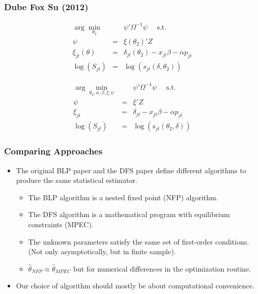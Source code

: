 \documentclass[xcolor=pdftex,dvipsnames,table,mathserif,aspectratio=169]{beamer}
\begin{document}
 \begin{frame}\frametitle{Dube Fox Su (2012)}
\footnotesize
\begin{eqnarray}
\label{blpnfxp}
\nonumber \arg \min_{\theta_2} && \psi' \Omega^{-1} \psi \quad \mbox{ s.t. } \\
\nonumber \psi &=& \xi(\theta_2)' Z\\
\xi_{jt}(\theta) &=& \delta_{jt}(\theta_2) - x_{jt} \beta - \alpha p_{jt} \\
\nonumber \log(S_{jt})  &=& \log(s_{jt}(\delta,\theta_2))
\end{eqnarray}

\begin{eqnarray}
\label{blpmpec}
\nonumber \arg \min_{\theta_2,\alpha,\beta, \xi,\psi} && \psi' \Omega^{-1}  \psi \quad \mbox{ s.t. } \\
 \psi &=& \xi' Z\\
\nonumber \xi_{jt} &=& \delta_{jt} - x_{jt} \beta - \alpha p_{jt} \\
\nonumber \log(S_{jt})  &=& \log(s_{jt}(\theta_2, \delta))
\end{eqnarray}
\end{frame}

\begin{frame}
\frametitle{Comparing Approaches}
\begin{itemize}
\item The original BLP paper and the DFS paper define different \alert{algorithms} to produce the same statistical \alert{estimator}.
\begin{itemize}
\item The BLP algorithm is a \alert{nested fixed point} (NFP) algorithm. 
\item The DFS algorithm is a \alert{mathematical program with equilibrium constraints} (MPEC).
\item The unknown parameters satisfy the same set of first-order conditions. (Not only asymptotically, but in finite sample).
\item $\hat{\theta}_{NFP} \approx \hat{\theta}_{MPEC}$ but for numerical differences in the optimization routine.
\end{itemize}
\item Our choice of algorithm should mostly be about computational convenience.
\end{itemize}
\end{frame}
\end{document}
